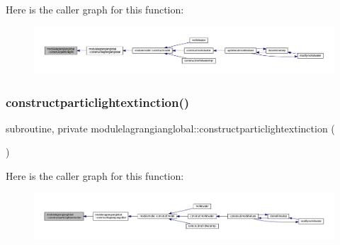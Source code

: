 Here is the caller graph for this function\+:\nopagebreak
\begin{figure}[H]
\begin{center}
\leavevmode
\includegraphics[width=350pt]{namespacemodulelagrangianglobal_aad6524644ca62cde451d62e0964fe5de_icgraph}
\end{center}
\end{figure}
\mbox{\label{namespacemodulelagrangianglobal_a4ba42e3d7ac7a48f0a6a551322aaf754}} 
\subsubsection{\texorpdfstring{constructparticlightextinction()}{constructparticlightextinction()}}
{\footnotesize\ttfamily subroutine, private modulelagrangianglobal\+::constructparticlightextinction (\begin{DoxyParamCaption}{ }\end{DoxyParamCaption})\hspace{0.3cm}{\ttfamily [private]}}

Here is the caller graph for this function\+:\nopagebreak
\begin{figure}[H]
\begin{center}
\leavevmode
\includegraphics[width=350pt]{namespacemodulelagrangianglobal_a4ba42e3d7ac7a48f0a6a551322aaf754_icgraph}
\end{center}
\end{figure}
\mbox{\label{namespacemodulelagrangianglobal_a070a6d8670eb489aaa0ce90aba70b1cc}} 
